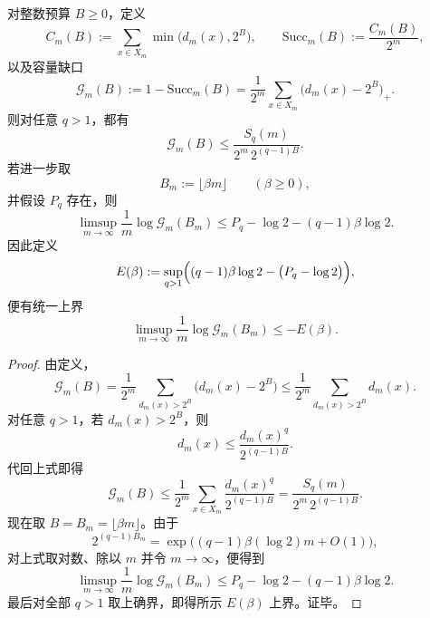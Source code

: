 \begin{theorem}\label{thm:xi-time-part57eb-oracle-gap-renyi-pressure-upper-bound}
对整数预算 \(B\ge 0\)，定义
\[
C_m(B):=\sum_{x\in X_m}\min\bigl(d_m(x),2^B\bigr),
\qquad
\mathrm{Succ}_m(B):=\frac{C_m(B)}{2^m},
\]
以及容量缺口
\[
\mathcal G_m(B):=1-\mathrm{Succ}_m(B)
=
\frac1{2^m}\sum_{x\in X_m}\bigl(d_m(x)-2^B\bigr)_+.
\]
则对任意 \(q>1\)，都有
\[
\mathcal G_m(B)\le \frac{S_q(m)}{2^m\,2^{(q-1)B}}.
\]
若进一步取
\[
B_m:=\lfloor \beta m\rfloor
\qquad(\beta\ge 0),
\]
并假设 \(P_q\) 存在，则
\[
\limsup_{m\to\infty}\frac1m\log \mathcal G_m(B_m)
\le
P_q-\log 2-(q-1)\beta\log 2.
\]
因此定义
\[
E(\beta):=
\sup_{q>1}\Bigl((q-1)\beta\log 2-\bigl(P_q-\log 2\bigr)\Bigr),
\]
便有统一上界
\[
\limsup_{m\to\infty}\frac1m\log \mathcal G_m(B_m)\le -E(\beta).
\]
\end{theorem}
\begin{proof}
由定义，
\[
\mathcal G_m(B)
=
\frac1{2^m}\sum_{d_m(x)>2^B}\bigl(d_m(x)-2^B\bigr)
\le
\frac1{2^m}\sum_{d_m(x)>2^B}d_m(x).
\]
对任意 \(q>1\)，若 \(d_m(x)>2^B\)，则
\[
d_m(x)\le \frac{d_m(x)^q}{2^{(q-1)B}}.
\]
代回上式即得
\[
\mathcal G_m(B)
\le
\frac1{2^m}\sum_{x\in X_m}\frac{d_m(x)^q}{2^{(q-1)B}}
=
\frac{S_q(m)}{2^m\,2^{(q-1)B}}.
\]
现在取 \(B=B_m=\lfloor \beta m\rfloor\)。由于
\[
2^{(q-1)B_m}
=
\exp\!\bigl((q-1)\beta(\log 2)m+O(1)\bigr),
\]
对上式取对数、除以 \(m\) 并令 \(m\to\infty\)，便得到
\[
\limsup_{m\to\infty}\frac1m\log \mathcal G_m(B_m)
\le
P_q-\log 2-(q-1)\beta\log 2.
\]
最后对全部 \(q>1\) 取上确界，即得所示 \(E(\beta)\) 上界。证毕。
\end{proof}

\endinput
